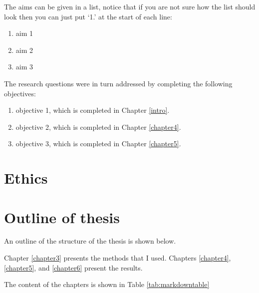 \documentclass[12pt,]{book}
\providecommand{\tightlist}{%
  \setlength{\itemsep}{0pt}\setlength{\parskip}{0pt}}
\begin{document}
The aims can be given in a list, notice that if you are not sure how the list should look then you can just put `1.' at the start of each line:

\begin{enumerate}
\def\labelenumi{\arabic{enumi}.}
\tightlist
\item
  aim 1
\item
  aim 2
\item
  aim 3
\end{enumerate}

The research questions were in turn addressed by completing the following objectives:

\begin{enumerate}
\def\labelenumi{\arabic{enumi}.}
\tightlist
\item
  objective 1, which is completed in Chapter \ref{intro}.
\item
  objective 2, which is completed in Chapter \ref{chapter4}.
\item
  objective 3, which is completed in Chapter \ref{chapter5}.
\end{enumerate}

\hypertarget{ethics}{%
\section{Ethics}\label{ethics}}

\blindtext

\hypertarget{outline-of-thesis}{%
\section{Outline of thesis}\label{outline-of-thesis}}

An outline of the structure of the thesis is shown below.

Chapter \ref{chapter3} presents the methods that I used.
Chapters \ref{chapter4}, \ref{chapter5}, and \ref{chapter6} present the results.

The content of the chapters is shown in Table \ref{tab:markdowntable}
\end{document}
